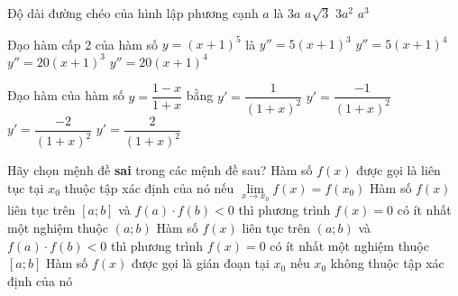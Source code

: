 \begin{ex}%
	Độ dài đường chéo của hình lập phương cạnh $a$ là
	\choice
	{$ 3a$}
	{\True $ a\sqrt{3}$}
	{ $3a^2$}
	{$a^3$}
\end{ex}
\begin{ex}%
	Đạo hàm cấp 2 của hàm số $y=(x+1)^5$ là
	\choice
	{$y''=5(x+1)^3 $}
	{ $y''=5(x+1)^4 $}
	{\True $ y''=20(x+1)^3$}
	{$y''=20(x+1)^4$}
\end{ex}
\begin{ex}%
	Đạo hàm của hàm số $y=\dfrac{1-x}{1+x}$ bằng
	\choice
	{$ y'=\dfrac{1}{(1+x)^2}$}
	{ $ y'=\dfrac{-1}{(1+x)^2} $}
	{ $ y'=\dfrac{-2}{(1+x)^2} $}
	{\True $ y'=\dfrac{2}{(1+x)^2} $}
\end{ex}
\begin{ex}%
	Hãy chọn mệnh đề {\bf sai} trong các mệnh đề sau?
	\choice
	{Hàm số $f(x)$ được gọi là liên tục tại $x_0$ thuộc tập xác định của nó nếu $\displaystyle \lim \limits_{x\to x_0} f(x)=f(x_0)$}
	{ Hàm số $f(x)$ liên tục trên $[a;b]$ và $f(a)\cdot f(b)<0$ thì phương trình $f(x)=0$ có ít nhất một nghiệm thuộc $(a;b)$}
	{\True  Hàm số $f(x)$ liên tục trên $(a;b)$ và $f(a)\cdot f(b)<0$ thì phương trình $f(x)=0$ có ít nhất một nghiệm thuộc $[a;b]$}
	{Hàm số $f(x)$ được gọi là gián đoạn tại $x_0$ nếu $x_0$ không thuộc tập xác định của nó} 
	\loigiai{
		
	} 
\end{ex}
